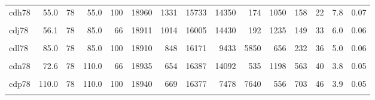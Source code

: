 \begin{landscape}
\begin{ThreePartTable}
\begin{longtable}[t]{lrrrrrrrrrrrrrr}
cdh78 & 55.0 & 78 & 55.0 & 100 & 18960 & 1331 & 15733 & 14350 & 174 & 1050 & 158 & 22 & 7.8 & 0.07\\
\cellcolor{gray!6}{cdi78} & \cellcolor{gray!6}{34.0} & \cellcolor{gray!6}{78} & \cellcolor{gray!6}{85.0} & \cellcolor{gray!6}{40} & \cellcolor{gray!6}{18860} & \cellcolor{gray!6}{1943} & \cellcolor{gray!6}{15031} & \cellcolor{gray!6}{13181} & \cellcolor{gray!6}{50} & \cellcolor{gray!6}{1715} & \cellcolor{gray!6}{88} & \cellcolor{gray!6}{5} & \cellcolor{gray!6}{11.4} & \cellcolor{gray!6}{0.06}\\
cdj78 & 56.1 & 78 & 85.0 & 66 & 18911 & 1014 & 16005 & 14430 & 192 & 1235 & 149 & 33 & 6.0 & 0.06\\
\cellcolor{gray!6}{cdk78} & \cellcolor{gray!6}{68.0} & \cellcolor{gray!6}{78} & \cellcolor{gray!6}{85.0} & \cellcolor{gray!6}{80} & \cellcolor{gray!6}{18909} & \cellcolor{gray!6}{1003} & \cellcolor{gray!6}{16015} & \cellcolor{gray!6}{14522} & \cellcolor{gray!6}{427} & \cellcolor{gray!6}{844} & \cellcolor{gray!6}{222} & \cellcolor{gray!6}{51} & \cellcolor{gray!6}{5.9} & \cellcolor{gray!6}{0.06}\\
cdl78 & 85.0 & 78 & 85.0 & 100 & 18910 & 848 & 16171 & 9433 & 5850 & 656 & 232 & 36 & 5.0 & 0.06\\
\cellcolor{gray!6}{cdm78} & \cellcolor{gray!6}{44.0} & \cellcolor{gray!6}{78} & \cellcolor{gray!6}{110.0} & \cellcolor{gray!6}{40} & \cellcolor{gray!6}{18885} & \cellcolor{gray!6}{1533} & \cellcolor{gray!6}{15463} & \cellcolor{gray!6}{12669} & \cellcolor{gray!6}{1377} & \cellcolor{gray!6}{1050} & \cellcolor{gray!6}{368} & \cellcolor{gray!6}{8} & \cellcolor{gray!6}{9.0} & \cellcolor{gray!6}{0.08}\\
cdn78 & 72.6 & 78 & 110.0 & 66 & 18935 & 654 & 16387 & 14092 & 535 & 1198 & 563 & 40 & 3.8 & 0.05\\
\cellcolor{gray!6}{cdo78} & \cellcolor{gray!6}{88.0} & \cellcolor{gray!6}{78} & \cellcolor{gray!6}{110.0} & \cellcolor{gray!6}{80} & \cellcolor{gray!6}{18944} & \cellcolor{gray!6}{457} & \cellcolor{gray!6}{16592} & \cellcolor{gray!6}{13132} & \cellcolor{gray!6}{1760} & \cellcolor{gray!6}{837} & \cellcolor{gray!6}{863} & \cellcolor{gray!6}{31} & \cellcolor{gray!6}{2.7} & \cellcolor{gray!6}{0.04}\\
cdp78 & 110.0 & 78 & 110.0 & 100 & 18940 & 669 & 16377 & 7478 & 7640 & 556 & 703 & 46 & 3.9 & 0.05\\
\cellcolor{gray!6}{cda94} & \cellcolor{gray!6}{13.0} & \cellcolor{gray!6}{94} & \cellcolor{gray!6}{32.6} & \cellcolor{gray!6}{40} & \cellcolor{gray!6}{19634} & \cellcolor{gray!6}{1916} & \cellcolor{gray!6}{15754} & \cellcolor{gray!6}{15243} & \cellcolor{gray!6}{59} & \cellcolor{gray!6}{430} & \cellcolor{gray!6}{22} & \cellcolor{gray!6}{5} & \cellcolor{gray!6}{10.8} & \cellcolor{gray!6}{0.07}\\

\end{longtable}
\end{ThreePartTable}
\end{landscape}
